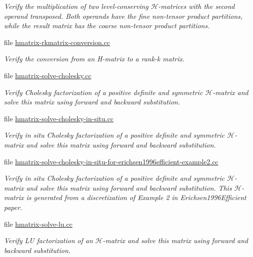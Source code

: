 \begin{DoxyCompactItemize}
\begin{DoxyCompactList}\small\item\em Verify the multiplication of two level-\/conserving $\mathcal{H}$-\/matrices with the second operand transposed. Both operands have the fine non-\/tensor product partitions, while the result matrix has the coarse non-\/tensor product partitions. \end{DoxyCompactList}\item 
file \hyperlink{hmatrix-rkmatrix-conversion_8cc}{hmatrix-\/rkmatrix-\/conversion.\+cc}
\begin{DoxyCompactList}\small\item\em Verify the conversion from an H-\/matrix to a rank-\/k matrix. \end{DoxyCompactList}\item 
file \hyperlink{hmatrix-solve-cholesky_8cc}{hmatrix-\/solve-\/cholesky.\+cc}
\begin{DoxyCompactList}\small\item\em Verify Cholesky factorization of a positive definite and symmetric $\mathcal{H}$-\/matrix and solve this matrix using forward and backward substitution. \end{DoxyCompactList}\item 
file \hyperlink{hmatrix-solve-cholesky-in-situ_8cc}{hmatrix-\/solve-\/cholesky-\/in-\/situ.\+cc}
\begin{DoxyCompactList}\small\item\em Verify in situ Cholesky factorization of a positive definite and symmetric $\mathcal{H}$-\/matrix and solve this matrix using forward and backward substitution. \end{DoxyCompactList}\item 
file \hyperlink{hmatrix-solve-cholesky-in-situ-for-erichsen1996efficient-example2_8cc}{hmatrix-\/solve-\/cholesky-\/in-\/situ-\/for-\/erichsen1996efficient-\/example2.\+cc}
\begin{DoxyCompactList}\small\item\em Verify in situ Cholesky factorization of a positive definite and symmetric $\mathcal{H}$-\/matrix and solve this matrix using forward and backward substitution. This $\mathcal{H}$-\/matrix is generated from a discretization of Example 2 in Erichsen1996\+Efficient paper. \end{DoxyCompactList}\item 
file \hyperlink{hmatrix-solve-lu_8cc}{hmatrix-\/solve-\/lu.\+cc}
\begin{DoxyCompactList}\small\item\em Verify LU factorization of an $\mathcal{H}$-\/matrix and solve this matrix using forward and backward substitution. \end{DoxyCompactList}\item 

\end{DoxyCompactItemize}
